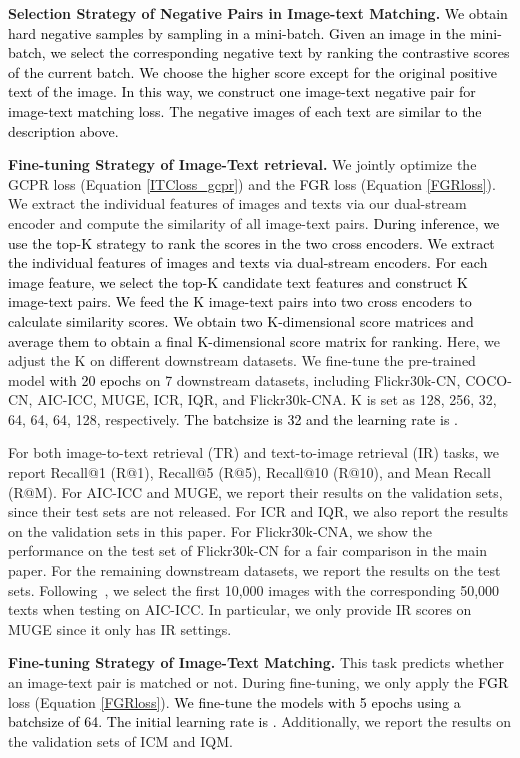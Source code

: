 \documentclass[sigconf]{acmart}
\def\jc{\textcolor{black}}
\def\blue{\textcolor{black}}
\def\mmljc{\textcolor{black}}
\def\mmcr{\textcolor{black}}
\begin{document}
\textbf{Selection Strategy of Negative Pairs in Image-text Matching.}
\blue{We obtain hard negative samples by sampling in a mini-batch. Given an image in the mini-batch, we select the corresponding negative text by ranking the contrastive scores of the current batch. We choose the higher score except for the original positive text of the image. In this way, we construct one image-text negative pair for \mmljc{image-text matching} loss. The negative images of each text are similar to the description above.}

\textbf{Fine-tuning Strategy of Image-Text retrieval.}
We jointly optimize the GCPR loss (Equation \ref{ITCloss_gcpr}) and the \mmcr{FGR} loss (Equation \ref{FGRloss}). 
We extract the individual features of images and texts via our dual-stream encoder and
compute the similarity of all image-text pairs. 
\mmcr{During inference, we use the top-K strategy to rank the scores in the two cross encoders. We extract the individual features of images and texts via dual-stream encoders. For each image feature, we select the top-K candidate text features and construct K image-text pairs. We feed the K image-text pairs into two cross encoders to calculate similarity scores. We obtain two K-dimensional score matrices and average them to obtain a final K-dimensional score matrix for ranking.}
Here, we adjust the K on different downstream datasets.
We fine-tune the pre-trained model \jc{with 20 epochs} on 7 downstream datasets, including Flickr30k-CN, COCO-CN, AIC-ICC, MUGE, ICR, IQR, and Flickr30k-CNA.
K is set as 128, 256, 32, 64, 64, 64, 128, respectively. \jc{The batchsize is 32 and the learning rate is .}

For both image-to-text retrieval (TR) and text-to-image retrieval (IR) tasks, we report Recall@1 (R@1), Recall@5 (R@5), Recall@10 (R@10), and Mean Recall (R@M).
For AIC-ICC and MUGE, we report their results on the validation sets, since their test sets are not released. For ICR and IQR, we also report the results on the validation sets in this paper.
For Flickr30k-CNA, we show the performance on the test set of Flickr30k-CN for a fair comparison in the main paper. 
For the remaining downstream datasets, we report the results on the test sets. Following~\cite{gu2022wukong}, we select the first 10,000 images with the corresponding 50,000 texts when testing on AIC-ICC. In particular, we only provide IR scores on MUGE since it only has IR settings.

\textbf{Fine-tuning Strategy of Image-Text Matching.}
This task predicts whether an image-text pair is matched or not. 
During fine-tuning, we only apply the \mmcr{FGR} loss (Equation \ref{FGRloss}). \jc{We fine-tune the models with 5 epochs using a batchsize of 64. The initial learning rate is .}
Additionally, we report the results on the validation sets of ICM and IQM.
\end{document}
